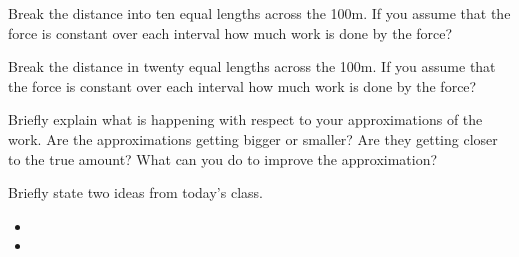 \begin{problem}
\begin{subproblem}
  \item Break the distance into ten equal lengths across the 100m.  If
    you assume that the force is constant over each interval how much
    work is done by the force?  

    \vfill

    \clearpage

  \item Break the distance in twenty equal lengths across the 100m.  If
    you assume that the force is constant over each interval how much
    work is done by the force?

    \vfill

  \item Briefly explain what is happening with respect to your
    approximations of the work. Are the approximations getting bigger
    or smaller? Are they getting closer to the true amount? What can
    you do to improve the approximation?

    \vspace{3em}

  \end{subproblem}
\end{problem}

\postClass

\begin{problem}
\item Briefly state two ideas from today's class.
  \begin{itemize}
  \item
  \item
  \end{itemize}
\item
  \begin{subproblem}
    \item
  \end{subproblem}
\end{problem}





